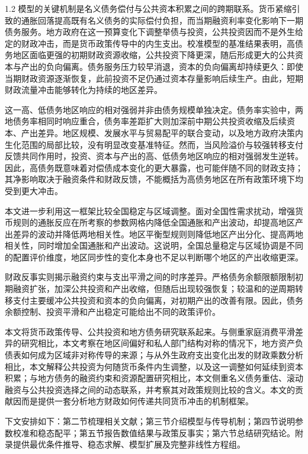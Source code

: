 \documentclass[12pt,UTF8]{ctexart}
\begin{document}
\begin{spacing}{1.2}
		模型的关键机制是名义债务偿付与公共资本积累之间的跨期联系。货币紧缩引致的通胀回落提高既有名义债务的实际偿付负担，而当期融资利率变化影响下一期债务服务。地方政府在这一预算变化下调整举债与投资，公共投资因而不是外生给定的财政冲击，而是货币政策传导中的内生支出。校准模型的基准结果表明，高债务地区面临更强的初期财政资源收缩，公共投资下降更深，随后形成更大的公共资本与产出的负向偏离。债务服务压力较早消退，资本的负向偏离却持续更久：即使当期财政资源逐渐恢复，此前投资不足仍通过资本存量影响后续生产。由此，短期财政流量冲击能够转化为持续的地区差异。
		
		这一高、低债务地区响应的相对强弱并非由债务规模单独决定。债务率实验中，两地债务率相同时响应重合，债务率差距扩大则加深前中期公共投资收缩及后续资本、产出差异。地区规模、发展水平与贸易配平的联合变动，以及地方政府决策内生化范围的局部比较，没有明显改变基准特征。然而，当风险溢价与较强转移支付反馈共同作用时，投资、资本与产出的高、低债务地区响应的相对强弱发生逆转。因此，高债务既意味着对偿债成本变化的更大暴露，也可能伴随不同的财政支持；其净影响取决于融资条件和财政反馈，不能概括为高债务地区在所有政策环境下均受到更大冲击。
		
		本文进一步利用这一框架比较全国稳定与区域调整。面对全国性需求扰动，增强货币规则的通胀反应在所考察的参数网格内降低全国通胀和产出波动，却提高地区产出差异的波动并降低两地相关性。地区平衡型规则则降低地区产出分化、提高两地相关性，同时增加全国通胀和产出波动。这说明，全国总量稳定与区域协调是不同的配置评价维度，地区同步性的变化本身也不足以判断哪个地区的产出收缩更深。
		
		财政反事实则揭示融资约束与支出平滑之间的时序差异。严格债务余额限额限制初期融资扩张，加深公共投资和产出收缩，但随后出现较强恢复；较温和的逆周期转移支付主要缓冲公共投资和资本的负向偏离，对初期产出的改善有限。因此，债务余额控制、投资平滑和产出稳定可能给出不同的政策评价。
		
		本文将货币政策传导、公共投资和地方债务研究联系起来。与侧重家庭消费平滑差异的研究相比，本文考察在地区间偏好和私人部门结构对称的情况下，地方资产负债表如何成为区域非对称传导的来源；与从外生政府支出变化出发的财政乘数分析相比，本文解释公共投资为何随货币条件内生调整，以及这一调整如何延续到资本积累；与地方债务的融资约束和资源配置研究相比，本文侧重名义债务重估、滚动融资与公共投资选择之间的动态联系，并考察其对政策规则比较的含义。本文的贡献因而是提供一套分析地方财政如何传递共同货币冲击的机制框架。
		
		下文安排如下：第二节梳理相关文献；第三节介绍模型与传导机制；第四节说明参数校准和稳态配平；第五节报告数值结果与政策反事实；第六节总结研究结论。附录提供最优条件推导、稳态求解、模型扩展及完整非线性方程组。
		

\end{spacing}
\end{document}
